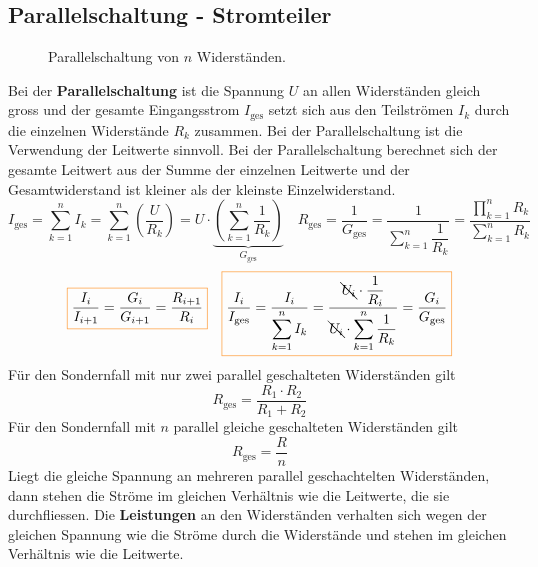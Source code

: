 \subsection{Parallelschaltung - Stromteiler}
\begin{figure}[H]
\centering
\caption{Parallelschaltung von $n$ Widerständen.}
\label{fig_IIIk}
\end{figure}
\noindent Bei der \textbf{Parallelschaltung} ist die Spannung $U$ an allen Widerständen gleich gross und der gesamte Eingangsstrom $I_{\text{ges}}$ setzt sich aus den Teilströmen $I_k$ durch die einzelnen Widerstände $R_k$ zusammen. Bei der Parallelschaltung ist die Verwendung der Leitwerte sinnvoll.
\newline\newline
Bei der Parallelschaltung berechnet sich der gesamte Leitwert aus der Summe der einzelnen Leitwerte und der Gesamtwiderstand ist kleiner als der kleinste Einzelwiderstand.
\begin{equation}
\boxed{I_{\text{ges}}=\displaystyle \sum_{k=1}^nI_k=\displaystyle \sum_{k=1}^n\left(\dfrac{U}{R_k}\right)=U\cdot \underbrace{\left(\displaystyle \sum_{k=1}^n\dfrac{1}{R_k}\right)}_{G_{\text{ges}}}}\quad \boxed{R_{\text{ges}}=\dfrac{1}{G_{\text{ges}}}=\dfrac{1}{\displaystyle \sum_{k=1}^n\dfrac{1}{R_k}}=\dfrac{\displaystyle \prod_{k=1}^nR_k}{\displaystyle \sum_{k=1}^nR_k}}
\end{equation}
\begin{equation}
\boxed{\dfrac{I_i}{I_{i+1}}=\dfrac{G_i}{G_{i+1}}=\dfrac{R_{i+1}}{R_i}}\quad \boxed{\dfrac{I_i}{I_{\text{ges}}}=\dfrac{I_i}{\displaystyle \sum_{k=1}^nI_k}=\dfrac{\bcancel{U_i}\cdot \dfrac{1}{R_i}}{\bcancel{U_i}\cdot \displaystyle \sum_{k=1}^n\dfrac{1}{R_k}}=\dfrac{G_i}{G_{\text{ges}}}}
\end{equation}
\noindent Für den Sondernfall mit nur zwei parallel geschalteten Widerständen gilt
\begin{equation}
\boxed{R_{\text{ges}}=\dfrac{R_1\cdot R_2}{R_1+R_2}}
\end{equation}
Für den Sondernfall mit $n$ parallel gleiche geschalteten Widerständen gilt
\begin{equation}
\boxed{R_{\text{ges}}=\dfrac{R}{n}}
\end{equation}
Liegt die gleiche Spannung an mehreren parallel geschachtelten Widerständen, dann stehen die Ströme im gleichen Verhältnis wie die Leitwerte, die sie durchfliessen. Die \textbf{Leistungen} an den Widerständen verhalten sich wegen der gleichen Spannung wie die Ströme durch die Widerstände und stehen im gleichen Verhältnis wie die Leitwerte.
